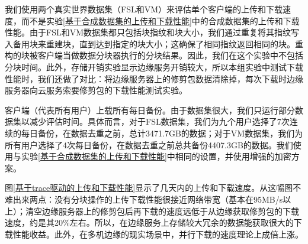 \documentclass[promaster]{thesis-uestc}
\begin{document}
我们使用两个真实世界数据集（FSL和VM）来评估单个客户端的上传和下载速度，而不是实验\ref{基于合成数据集的上传和下载性能}中的合成数据集的上传和下载性能。由于FSL和VM数据集都只包括块指纹和块大小，我们通过重复将其指纹写入备用块来重建块，直到达到指定的块大小；这确保了相同指纹返回相同的块。重构的块被客户端当做数据分块器执行的分块结果。因此，我们在这个实验中不包括分块时间。此外，存储开销实验显示边缘服务开销较大，所以本组实验中测试下载性能时，我们还做了对比：将边缘服务器上的修剪包数据清除掉，每次下载时边缘服务器向云服务索要修剪包的下载性能测试实验。

客户端（代表所有用户）上载所有每日备份。由于数据集很大，我们只运行部分数据集以减少评估时间。具体而言，对于FSL数据集，我们为九个用户选择了7次连续的每日备份，在数据去重之前，总计3471.7GB的数据；对于VM数据集，我们为所有用户选择了4次每日备份，在数据去重之前总共备份4407.3GB的数据。我们使用与实验\ref{基于合成数据集的上传和下载性能}中相同的设置，并使用增强的加密方案。

图\ref{基于trace驱动的上传和下载性能}显示了几天内的上传和下载速度。从这幅图不难出来两点：没有分块操作的上传下载性能很接近网络带宽（基本在95MB/s以上）；清空边缘服务器上的修剪包后再下载的速度远低于从边缘获取修剪包的下载速度，约是其20\%左右。所以，在边缘服务上存储较大冗余的数据能获取很大的下载性能收益。此外，在多机边缘的现实场景中，并行下载的速度理论上成倍上涨。
\end{document}
